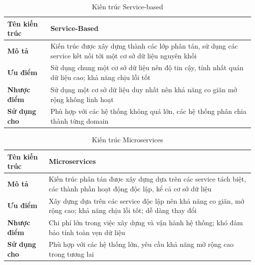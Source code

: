 \begin{table}[h]
    \begin{tabular}{|p{3cm}|p{12cm}|}
        \hline
        \textbf{Tên kiến trúc} & Service-Based\\
        \hline
        \textbf{Mô tả}         & Kiến trúc được xây dựng thành các lớp phân tán, sử dụng các service kết nối tới một cơ sở dữ liệu nguyên khối     \\
        \hline
        \textbf{Ưu điểm}       & Sử dụng chung một cơ sở dữ liệu nên độ tin cậy, tính nhất quán dữ liệu cao; khả năng chịu lỗi tốt \\
        \hline
        \textbf{Nhược điểm}    & Sử dụng một cơ sở dữ liệu duy nhất nên khả năng co giãn mở rộng không linh hoạt   \\
        \hline
        \textbf{Sử dụng cho}   & Phù hợp với các hệ thống không quá lớn, các hệ thống phân chia thành từng domain                   \\
        \hline
    \end{tabular}
    \caption{Kiến trúc Service-based}
\end{table}

\newpage
 
\begin{table}[h]
    \begin{tabular}{|p{3cm}|p{12cm}|}
        \hline
        \textbf{Tên kiến trúc} & Microservices\\
        \hline
        \textbf{Mô tả}         & Kiến trúc phân tán được xây dựng dựa trên các service tách biệt, các thành phần hoạt động độc lập, kể cả cơ sở dữ liệu    \\
        \hline
        \textbf{Ưu điểm}       & Xây dựng dựa trên các service độc lập nên khả năng co giãn, mở rộng cao; khả năng chịu lỗi tốt; dễ dàng thay đổi\\
        \hline
        \textbf{Nhược điểm}    & Chi phí lớn trong việc xây dựng và vận hành hệ thống; khó đảm bảo tính toàn vẹn dữ liệu \\
        \hline
        \textbf{Sử dụng cho}   & Phù hợp với các hệ thống lớn, yêu cầu khả năng mở rộng cao trong tương lai                  \\
        \hline
    \end{tabular}
    \caption{Kiến trúc Microservices}
\end{table}
 
\newpage
 
